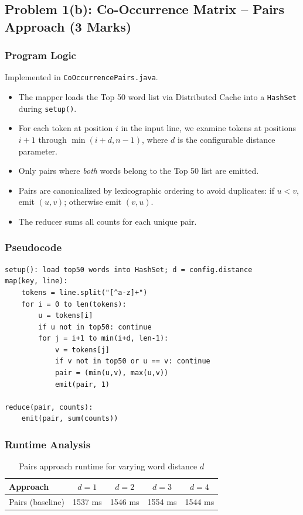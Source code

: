 \documentclass[12pt,a4paper]{article}
\begin{document}
\subsection{Problem 1(b): Co-Occurrence Matrix -- Pairs Approach (3 Marks)}

\subsubsection{Program Logic}
Implemented in \texttt{CoOccurrencePairs.java}.

\begin{itemize}
  \item The mapper loads the Top 50 word list via Distributed Cache into a \texttt{HashSet} during \texttt{setup()}.
  \item For each token at position $i$ in the input line, we examine tokens at positions $i+1$ through $\min(i+d, n-1)$, where $d$ is the configurable distance parameter.
  \item Only pairs where \emph{both} words belong to the Top 50 list are emitted.
  \item Pairs are canonicalized by lexicographic ordering to avoid duplicates: if $u < v$, emit $(u,v)$; otherwise emit $(v,u)$.
  \item The reducer sums all counts for each unique pair.
\end{itemize}

\subsubsection{Pseudocode}
\begin{lstlisting}
setup(): load top50 words into HashSet; d = config.distance
map(key, line):
    tokens = line.split("[^a-z]+")
    for i = 0 to len(tokens):
        u = tokens[i]
        if u not in top50: continue
        for j = i+1 to min(i+d, len-1):
            v = tokens[j]
            if v not in top50 or u == v: continue
            pair = (min(u,v), max(u,v))
            emit(pair, 1)

reduce(pair, counts):
    emit(pair, sum(counts))
\end{lstlisting}

\subsubsection{Runtime Analysis}
\begin{table}[H]
  \centering
  \begin{tabular}{@{}lcccc@{}}
    \toprule
    \textbf{Approach} & $d=1$ & $d=2$ & $d=3$ & $d=4$ \\
    \midrule
    Pairs (baseline) & 1537 ms & 1546 ms & 1554 ms & 1544 ms \\ 
    \bottomrule
  \end{tabular}
  \caption{Pairs approach runtime for varying word distance $d$}
\end{table}
\end{document}
